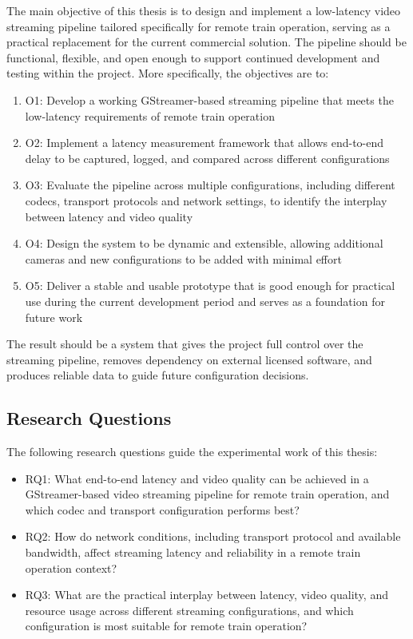 The main objective of this thesis is to design and implement a low-latency video streaming pipeline tailored specifically for remote train operation, serving as a practical replacement for the current commercial solution. The pipeline should be functional, flexible, and open enough to support continued development and testing within the project.
More specifically, the objectives are to:

\begin{enumerate}
    \item O1: Develop a working GStreamer-based streaming pipeline that meets the low-latency requirements of remote train operation
    \item O2: Implement a latency measurement framework that allows end-to-end delay to be captured, logged, and compared across different configurations
    \item O3: Evaluate the pipeline across multiple configurations, including different codecs, transport protocols and network settings, to identify the interplay between latency and video quality
    \item O4: Design the system to be dynamic and extensible, allowing additional cameras and new configurations to be added with minimal effort
    \item O5: Deliver a stable and usable prototype that is good enough for practical use during the current development period and serves as a foundation for future work
\end{enumerate}

The result should be a system that gives the project full control over the streaming pipeline, removes dependency on external licensed software, and produces reliable data to guide future configuration decisions.

\subsection{Research Questions}
The following research questions guide the experimental work of this thesis:
\begin{itemize}
    \item RQ1: What end-to-end latency and video quality can be achieved in a GStreamer-based video streaming pipeline for remote train operation, and which codec and transport configuration performs best?
    \item RQ2: How do network conditions, including transport protocol and available bandwidth, affect streaming latency and reliability in a remote train operation context?
    \item RQ3: What are the practical interplay between latency, video quality, and resource usage across different streaming configurations, and which configuration is most suitable for remote train operation?
\end{itemize}


